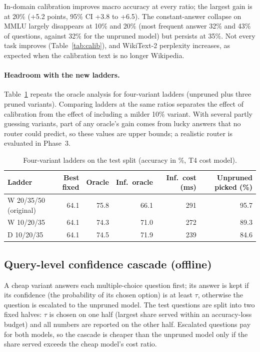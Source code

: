 In-domain calibration improves macro accuracy at every ratio; the largest gain is at 20\% ($+$5.2 points, 95\% CI +3.8 to +6.5). The constant-answer collapse on MMLU largely disappears at 10\% and 20\% (most frequent answer 32\% and 43\% of questions, against 32\% for the unpruned model) but persists at 35\%. Not every task improves (Table~\ref{tab:calib}), and WikiText-2 perplexity increases, as expected when the calibration text is no longer Wikipedia.

\paragraph{Headroom with the new ladders.} Table~\ref{tab:ladders} repeats the oracle analysis for four-variant ladders (unpruned plus three pruned variants). Comparing ladders at the same ratios separates the effect of calibration from the effect of including a milder 10\% variant. With several partly guessing variants, part of any oracle's gain comes from lucky answers that no router could predict, so these values are upper bounds; a realistic router is evaluated in Phase~3.

\begin{table}[!htbp]\centering\small
\begin{tabular}{lrrrrr}
\toprule
Ladder & Best fixed & Oracle & Inf.\ oracle & Inf.\ cost (ms) & Unpruned picked (\%) \\
\midrule
W 20/35/50 (original) & 64.1 & 75.8 & 66.1 & 291 & 95.7 \\
W 10/20/35 & 64.1 & 74.3 & 71.0 & 272 & 89.3 \\
D 10/20/35 & 64.1 & 74.5 & 71.9 & 239 & 84.6 \\
\bottomrule
\end{tabular}
\caption{Four-variant ladders on the test split (accuracy in \%, T4 cost model).}\label{tab:ladders}
\end{table}

\subsection{Query-level confidence cascade (offline)}
A cheap variant answers each multiple-choice question first; its answer is kept if its confidence (the probability of its chosen option) is at least $\tau$, otherwise the question is escalated to the unpruned model. The test questions are split into two fixed halves: $\tau$ is chosen on one half (largest share served within an accuracy-loss budget) and all numbers are reported on the other half. Escalated questions pay for both models, so the cascade is cheaper than the unpruned model only if the share served exceeds the cheap model's cost ratio.


